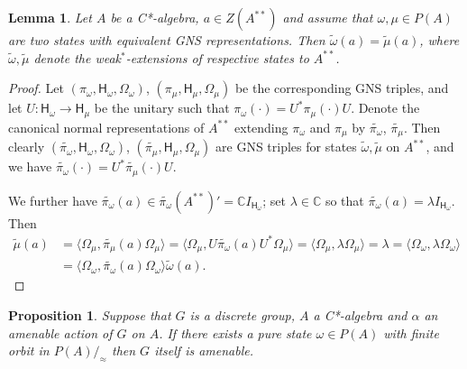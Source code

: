 \documentclass[11 pt, leqno, hidelinks]{amsart}%
\theoremstyle{plain}
\newtheorem{lemma}[theorem]{Lemma}
\newtheorem{proposition}[theorem]{Proposition}
\numberwithin{equation}{section}
\newcommand{\C}{\mathbb{C}}
\newcommand{\Hil}{\mathsf{H}}
\begin{document}
\begin{lemma} \label{lem:basic}
Let $A$ be a C*-algebra, $a \in Z(A^{**})$ and assume that $\omega, \mu \in P(A)$ are two states with equivalent GNS representations. Then $\tilde{\omega}(a)= \tilde{\mu}(a)$, where $\tilde{\omega}, \tilde{\mu}$ denote the weak$^*$-extensions of respective states to $A^{**}$.
\end{lemma}
\begin{proof}
Let $(\pi_\omega, \Hil_\omega, \Omega_\omega)$, 	$(\pi_\mu, \Hil_\mu, \Omega_\mu)$ be the corresponding GNS triples, and let $U:\Hil_\omega \to \Hil_\mu$ be the unitary such that $\pi_\omega (\cdot) = U^* \pi_\mu(\cdot)U$.
Denote the canonical normal representations of $A^{**}$ extending $\pi_\omega$ and $\pi_\mu$ by $\widetilde{\pi_\omega}$, $\widetilde{\pi_\mu}$. Then clearly $(\widetilde{\pi_\omega}, \Hil_\omega, \Omega_\omega)$, 	$(\widetilde{\pi_\mu}, \Hil_\mu, \Omega_\mu)$ are GNS triples for states $\tilde{\omega}, \tilde{\mu}$ on $A^{**}$, and we have $\widetilde{\pi_\omega} (\cdot) = U^* \widetilde{\pi_\mu}(\cdot)U$.

We further have $\widetilde{\pi_\omega}(a) \in \widetilde{\pi_\omega}(A^{**})' =\C I_{\Hil_\omega}$; set $\lambda \in \C$ so that
$\widetilde{\pi_\omega}(a) = \lambda I_{\Hil_\omega}$. Then
\begin{align*} \tilde{\mu}(a) &= \langle \Omega_\mu, \widetilde{\pi_\mu}(a) \Omega_\mu \rangle = \langle \Omega_\mu, U \widetilde{\pi_\omega}(a)U^* \Omega_\mu \rangle = \langle \Omega_\mu, \lambda \Omega_\mu \rangle = \lambda = \langle \Omega_\omega, \lambda  \Omega_\omega \rangle \\&= \langle \Omega_\omega, \widetilde{\pi_\omega}(a)  \Omega_\omega \rangle\tilde{\omega}(a).
 \end{align*}
\end{proof}


\begin{proposition} \label{prop:amenable}
Suppose that  $G$ is a discrete  group, $A$ a C*-algebra and $\alpha$ an amenable action of $G$ on $A$.	If there exists a pure state $\omega \in P(A)$ with finite orbit in $P(A)/_{\approx}$ then $G$ itself is amenable.
\end{proposition}
\end{document}

